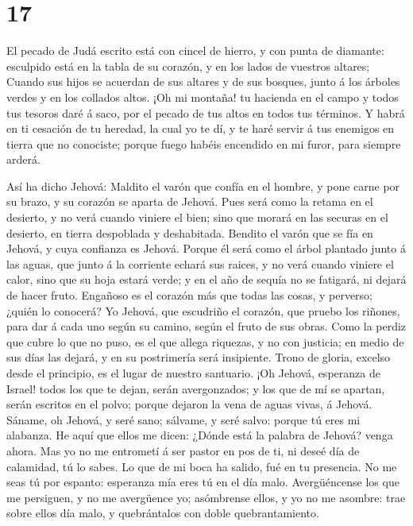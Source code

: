 \hypertarget{section-16}{%
\section{17}\label{section-16}}

 El pecado de Judá escrito está con cincel de hierro, y con
punta de diamante: esculpido está en la tabla de su corazón, y en los
lados de vuestros altares;  Cuando sus hijos se acuerdan de
sus altares y de sus bosques, junto á los árboles verdes y en los
collados altos.  ¡Oh mi montaña! tu hacienda en el campo y
todos tus tesoros daré á saco, por el pecado de tus altos en todos tus
términos.  Y habrá en ti cesación de tu heredad, la cual yo
te dí, y te haré servir á tus enemigos en tierra que no conociste;
porque fuego habéis encendido en mi furor, para siempre arderá.

 Así ha dicho Jehová: Maldito el varón que confía en el
hombre, y pone carne por su brazo, y su corazón se aparta de Jehová.
 Pues será como la retama en el desierto, y no verá cuando
viniere el bien; sino que morará en las securas en el desierto, en
tierra despoblada y deshabitada.  Bendito el varón que se
fía en Jehová, y cuya confianza es Jehová.  Porque él será
como el árbol plantado junto á las aguas, que junto á la corriente
echará sus raices, y no verá cuando viniere el calor, sino que su hoja
estará verde; y en el año de sequía no se fatigará, ni dejará de hacer
fruto.  Engañoso es el corazón más que todas las cosas, y
perverso; ¿quién lo conocerá?  Yo Jehová, que escudriño el
corazón, que pruebo los riñones, para dar á cada uno según su camino,
según el fruto de sus obras.  Como la perdiz que cubre lo
que no puso, es el que allega riquezas, y no con justicia; en medio de
sus días las dejará, y en su postrimería será insipiente. 
Trono de gloria, excelso desde el principio, es el lugar de nuestro
santuario.  ¡Oh Jehová, esperanza de Israel! todos los que
te dejan, serán avergonzados; y los que de mí se apartan, serán escritos
en el polvo; porque dejaron la vena de aguas vivas, á Jehová.
 Sáname, oh Jehová, y seré sano; sálvame, y seré salvo:
porque tú eres mi alabanza.  He aquí que ellos me dicen:
¿Dónde está la palabra de Jehová? venga ahora.  Mas yo no
me entrometí á ser pastor en pos de ti, ni deseé día de calamidad, tú lo
sabes. Lo que de mi boca ha salido, fué en tu presencia. 
No me seas tú por espanto: esperanza mía eres tú en el día malo.
 Avergüéncense los que me persiguen, y no me avergüence yo;
asómbrense ellos, y yo no me asombre: trae sobre ellos día malo, y
quebrántalos con doble quebrantamiento.

